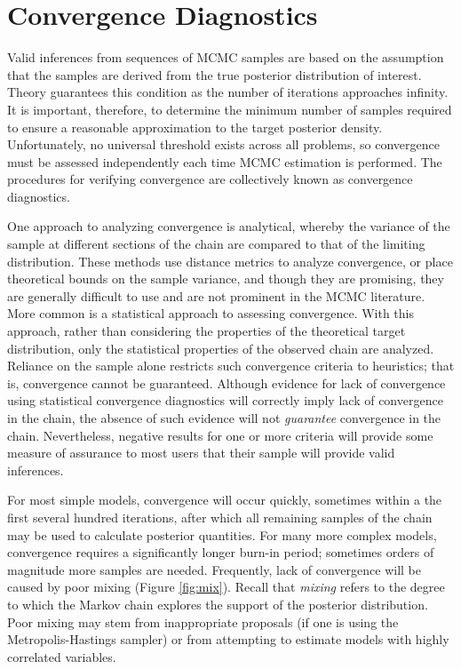 \hypertarget{convergence}{}
\section*{Convergence Diagnostics} %

Valid inferences from sequences of MCMC samples are based on the assumption that the samples are derived from the true posterior distribution of interest. Theory guarantees this condition as the number of iterations approaches infinity. It is important, therefore, to determine the minimum number of samples required to ensure a reasonable approximation to the target posterior density. Unfortunately, no universal threshold exists across all problems, so convergence must be assessed independently each time MCMC estimation is performed. The procedures for verifying convergence are collectively known as convergence diagnostics.

One approach to analyzing convergence is analytical, whereby the variance of the sample at different sections of the chain are compared to that of the limiting distribution. These methods use distance metrics to analyze convergence, or place theoretical bounds on the sample variance, and though they are promising, they are generally difficult to use and are not prominent in the MCMC literature. More common is a statistical approach to assessing convergence. With this approach, rather than considering the properties of the theoretical target distribution, only the statistical properties of the observed chain are analyzed. Reliance on the sample alone restricts such convergence criteria to heuristics; that is, convergence cannot be guaranteed. Although evidence for lack of convergence using statistical convergence diagnostics will correctly imply lack of convergence in the chain, the absence of such evidence will not \emph{guarantee} convergence in the chain. Nevertheless, negative results for one or more criteria will provide some measure of assurance to most users that their sample will provide valid inferences.

For most simple models, convergence will occur quickly, sometimes within a the first several hundred iterations, after which all remaining samples of the chain may be used to calculate posterior quantities. For many more complex models, convergence requires a significantly longer burn-in period; sometimes  orders of magnitude more samples are needed. Frequently, lack of convergence will be caused by poor mixing (Figure \ref{fig:mix}). Recall that \emph{mixing} refers to the degree to which the Markov chain explores the support of the posterior distribution. Poor mixing may stem from inappropriate proposals (if one is using the Metropolis-Hastings sampler) or from attempting to estimate models with highly correlated variables.

